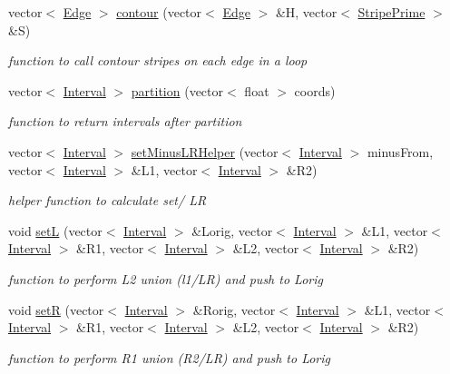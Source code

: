 \begin{DoxyCompactItemize}
vector$<$ \hyperlink{classEdge}{Edge} $>$ \hyperlink{classContour_a759427c3b84a8b17bf9dcedddc4be48f}{contour} (vector$<$ \hyperlink{classEdge}{Edge} $>$ \&H, vector$<$ \hyperlink{classStripePrime}{Stripe\+Prime} $>$ \&S)
\begin{DoxyCompactList}\small\item\em function to call contour stripes on each edge in a loop \end{DoxyCompactList}\item 
vector$<$ \hyperlink{classInterval}{Interval} $>$ \hyperlink{classContour_a897419a7c2395ef5a367a784e063454d}{partition} (vector$<$ float $>$ coords)
\begin{DoxyCompactList}\small\item\em function to return intervals after partition \end{DoxyCompactList}\item 
vector$<$ \hyperlink{classInterval}{Interval} $>$ \hyperlink{classContour_adde8de028db63f76082daea730ca87ed}{set\+Minus\+L\+R\+Helper} (vector$<$ \hyperlink{classInterval}{Interval} $>$ minus\+From, vector$<$ \hyperlink{classInterval}{Interval} $>$ \&L1, vector$<$ \hyperlink{classInterval}{Interval} $>$ \&R2)
\begin{DoxyCompactList}\small\item\em helper function to calculate set/ LR \end{DoxyCompactList}\item 
void \hyperlink{classContour_a89c3cb99cdd161bef97100bfdac69211}{setL} (vector$<$ \hyperlink{classInterval}{Interval} $>$ \&Lorig, vector$<$ \hyperlink{classInterval}{Interval} $>$ \&L1, vector$<$ \hyperlink{classInterval}{Interval} $>$ \&R1, vector$<$ \hyperlink{classInterval}{Interval} $>$ \&L2, vector$<$ \hyperlink{classInterval}{Interval} $>$ \&R2)
\begin{DoxyCompactList}\small\item\em function to perform L2 union (l1/\+LR) and push to Lorig \end{DoxyCompactList}\item 
void \hyperlink{classContour_aeff6ed3f1354733449c660ec77008093}{setR} (vector$<$ \hyperlink{classInterval}{Interval} $>$ \&Rorig, vector$<$ \hyperlink{classInterval}{Interval} $>$ \&L1, vector$<$ \hyperlink{classInterval}{Interval} $>$ \&R1, vector$<$ \hyperlink{classInterval}{Interval} $>$ \&L2, vector$<$ \hyperlink{classInterval}{Interval} $>$ \&R2)
\begin{DoxyCompactList}\small\item\em function to perform R1 union (R2/\+LR) and push to Lorig \end{DoxyCompactList}\item 

\end{DoxyCompactItemize}
